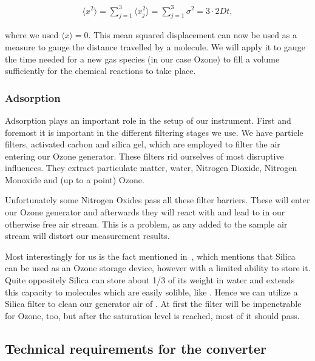 \begin{align}
  \langle x^2 \rangle = \sum_{j=1}^3 \langle
  x_j^2 \rangle = \sum_{j=1}^3 \sigma^2 = 3 \cdot 2Dt, \label{eq:mqd}
\end{align}

where we used $\langle x \rangle = 0$. This mean squared displacement
can now be used as a measure to gauge the distance travelled by a
molecule. We will apply it to gauge the time needed for a new gas
species (in our case Ozone) to fill a volume sufficiently for the
chemical reactions to take place.

\subsubsection{Adsorption}
\label{sec:adsorption}

Adsorption plays an important role in the setup of our
instrument. First and foremost it is important in the different
filtering stages we use. We have particle filters, activated carbon
and silica gel, which are employed to filter the air entering our
Ozone generator. These filters rid ourselves of most disruptive
influences. They extract particulate matter, water, Nitrogen Dioxide,
Nitrogen Monoxide and (up to a point) Ozone. 

Unfortunately some Nitrogen Oxides pass all these filter
barriers. These will enter our Ozone generator and
afterwards they will react with  and lead to  in our
otherwise  free air stream. This is a problem, as any 
added to the sample air stream will distort our measurement results.

Most interestingly for us is the fact mentioned
in~\cite{ozone-silica}, which mentions that Silica can be used as an
Ozone storage device, however with a limited ability to store
it. Quite oppositely Silica can store about {\nfrac{} 1/3} of its
weight in water  and extends this capacity to molecules
which are easily solible, like . Hence we can utilize a Silica
filter to clean our generator air of . At first the filter
will be impenetrable for Ozone, too, but after the saturation level is
reached, most of it should pass. 

\subsection{Technical requirements for the converter}
\label{sec:requirements}

